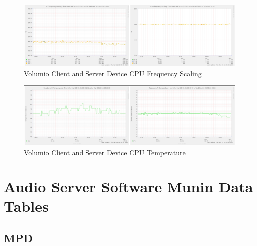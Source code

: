 \documentclass[11pt,a4paper,headinclude=false,footinclude=false]{scrreprt}
\begin{document}
\begin{figure}[H]
\includegraphics{ResultsAndAnalysis/VolumioServerTestImages/002VolumioCPUFreqScaling.png}
\centering
\caption{Volumio Client and Server Device CPU Frequency Scaling}
\label{VolumioCPUFreqScaling}
\end{figure}

\begin{figure}[H]
\includegraphics{ResultsAndAnalysis/VolumioServerTestImages/003VolumioCPUTemp.png}
\centering
\caption{Volumio Client and Server Device CPU Temperature}
\label{VolumioCPUTemp}
\end{figure}

\section{\texorpdfstring{Audio Server Software Munin Data Tables
\label{AppendicesAudioServerSoftwareTables}}{Audio Server Software Munin Data Tables }}\label{audio-server-software-munin-data-tables}

\subsection{MPD}\label{mpd-3}
\end{document}
